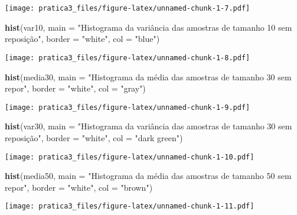 \documentclass[]{article}
\newenvironment{Shaded}{\begin{snugshade}}{\end{snugshade}}
\newcommand{\KeywordTok}[1]{\textcolor[rgb]{0.13,0.29,0.53}{\textbf{#1}}}
\newcommand{\DataTypeTok}[1]{\textcolor[rgb]{0.13,0.29,0.53}{#1}}
\newcommand{\StringTok}[1]{\textcolor[rgb]{0.31,0.60,0.02}{#1}}
\newcommand{\NormalTok}[1]{#1}
\begin{document}
\texttt{[image: pratica3\_files/figure-latex/unnamed-chunk-1-7.pdf]}

\begin{Shaded}
\begin{Highlighting}[]
\KeywordTok{hist}\NormalTok{(var10, }\DataTypeTok{main =} \StringTok{"Histograma da variância das amostras de tamanho 10 sem reposição"}\NormalTok{, }\DataTypeTok{border =} \StringTok{"white"}\NormalTok{, }\DataTypeTok{col =} \StringTok{"blue"}\NormalTok{)}
\end{Highlighting}
\end{Shaded}

\texttt{[image: pratica3\_files/figure-latex/unnamed-chunk-1-8.pdf]}

\begin{Shaded}
\begin{Highlighting}[]
\KeywordTok{hist}\NormalTok{(media30, }\DataTypeTok{main =} \StringTok{"Histograma da média das amostras de tamanho 30 sem repor"}\NormalTok{, }\DataTypeTok{border =} \StringTok{"white"}\NormalTok{, }\DataTypeTok{col =} \StringTok{"gray"}\NormalTok{)}
\end{Highlighting}
\end{Shaded}

\texttt{[image: pratica3\_files/figure-latex/unnamed-chunk-1-9.pdf]}

\begin{Shaded}
\begin{Highlighting}[]
\KeywordTok{hist}\NormalTok{(var30, }\DataTypeTok{main =} \StringTok{"Histograma da variância das amostras de tamanho 30 sem reposição"}\NormalTok{, }\DataTypeTok{border =} \StringTok{"white"}\NormalTok{, }\DataTypeTok{col =} \StringTok{"dark green"}\NormalTok{)}
\end{Highlighting}
\end{Shaded}

\texttt{[image: pratica3\_files/figure-latex/unnamed-chunk-1-10.pdf]}

\begin{Shaded}
\begin{Highlighting}[]
\KeywordTok{hist}\NormalTok{(media50, }\DataTypeTok{main =} \StringTok{"Histograma da média das amostras de tamanho 50 sem repor"}\NormalTok{, }\DataTypeTok{border =} \StringTok{"white"}\NormalTok{, }\DataTypeTok{col =} \StringTok{"brown"}\NormalTok{)}
\end{Highlighting}
\end{Shaded}

\texttt{[image: pratica3\_files/figure-latex/unnamed-chunk-1-11.pdf]}
\end{document}
